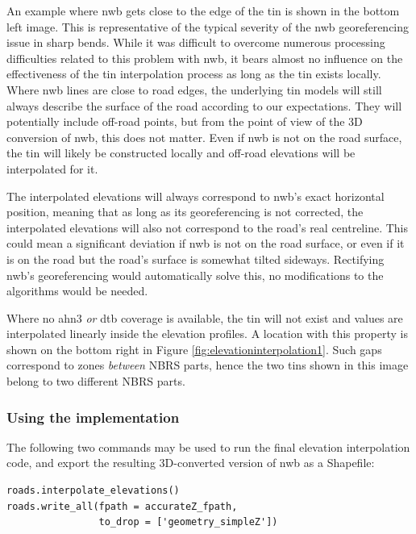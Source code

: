 An example where \ac{nwb} gets close to the edge of the \ac{tin} is shown in the bottom left image. This is representative of the typical severity of the \ac{nwb} georeferencing issue in sharp bends. While it was difficult to overcome numerous processing difficulties related to this problem with \ac{nwb}, it bears almost no influence on the effectiveness of the \ac{tin} interpolation process as long as the \ac{tin} exists locally. Where \ac{nwb} lines are close to road edges, the underlying \ac{tin} models will still always describe the surface of the road according to our expectations. They will potentially include off-road points, but from the point of view of the 3D conversion of \ac{nwb}, this does not matter. Even if \ac{nwb} is not on the road surface, the \ac{tin} will likely be constructed locally and off-road elevations will be interpolated for it.

The interpolated elevations will always correspond to \ac{nwb}'s exact horizontal position, meaning that as long as its georeferencing is not corrected, the interpolated elevations will also not correspond to the road's real centreline. This could mean a significant deviation if \ac{nwb} is not on the road surface, or even if it is on the road but the road's surface is somewhat tilted sideways. Rectifying \ac{nwb}'s georeferencing would automatically solve this, no modifications to the algorithms would be needed.

Where no \ac{ahn3} \textit{or} \ac{dtb} coverage is available, the \ac{tin} will not exist and values are interpolated linearly inside the elevation profiles. A location with this property is shown on the bottom right in Figure \ref{fig:elevationinterpolation1}. Such gaps correspond to zones \textit{between} NBRS parts, hence the two \ac{tin}s shown in this image belong to two different NBRS parts.

\subsubsection{Using the implementation}

The following two commands may be used to run the final elevation interpolation code, and export the resulting 3D-converted version of \ac{nwb} as a Shapefile:

\begin{verbatim}
roads.interpolate_elevations()
roads.write_all(fpath = accurateZ_fpath,
                to_drop = ['geometry_simpleZ'])
\end{verbatim}

